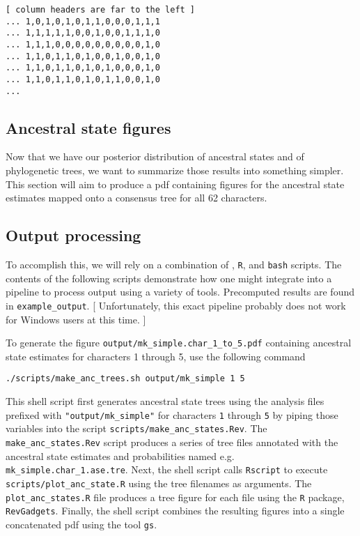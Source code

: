 {\tt \begin{snugshade*}
\begin{lstlisting}
[ column headers are far to the left ]
... 1,0,1,0,1,0,1,1,0,0,0,1,1,1
... 1,1,1,1,1,0,0,1,0,0,1,1,1,0
... 1,1,1,0,0,0,0,0,0,0,0,0,1,0
... 1,1,0,1,1,0,1,0,0,1,0,0,1,0
... 1,1,0,1,1,0,1,0,1,0,0,0,1,0
... 1,1,0,1,1,0,1,0,1,1,0,0,1,0
...
\end{lstlisting}
\end{snugshade*}}

\subsection{Ancestral state figures}

Now that we have our posterior distribution of ancestral states and of phylogenetic trees, we want to summarize those results into something simpler.
This section will aim to produce a pdf containing figures for the ancestral state estimates mapped onto a consensus tree for all 62 characters.

\subsection{Output processing}

To accomplish this, we will rely on a combination of \RevBayes, {\tt R}, and {\tt bash} scripts.
The contents of the following scripts demonstrate how one might integrate \RevBayes into a pipeline to process output using a variety of tools.
Precomputed results are found in {\tt example\_output}.
[ Unfortunately, this exact pipeline probably does not work for Windows users at this time. ]

To generate the figure {\tt output/mk\_simple.char\_1\_to\_5.pdf} containing ancestral state estimates for characters 1 through 5, use the following command

{\tt \begin{snugshade*}
\begin{lstlisting}
./scripts/make_anc_trees.sh output/mk_simple 1 5
\end{lstlisting}
\end{snugshade*}}

This shell script first generates ancestral state trees using the analysis files prefixed with {\tt "output/mk\_simple"} for characters {\tt 1} through {\tt 5} by piping those variables into the \RevBayes script {\tt scripts/make\_anc\_states.Rev}.
The {\tt make\_anc\_states.Rev} script produces a series of tree files annotated with the ancestral state estimates and probabilities named e.g. {\tt mk\_simple.char\_1.ase.tre}.
Next, the shell script calls {\tt Rscript} to execute {\tt scripts/plot\_anc\_state.R} using the tree filenames as arguments.
The {\tt plot\_anc\_states.R} file produces a tree figure for each file using the {\tt R} package, {\tt RevGadgets}.
Finally, the shell script combines the resulting figures into a single concatenated pdf using the tool {\tt gs}.



